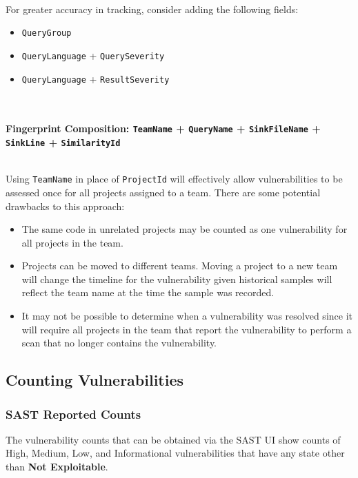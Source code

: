 \noindent\\For greater accuracy in tracking, consider adding the following fields:

\begin{itemize}
    \item \texttt{QueryGroup}
    \item \texttt{QueryLanguage} + \texttt{QuerySeverity}
    \item \texttt{QueryLanguage} + \texttt{ResultSeverity}
\end{itemize}

\textbf{\noindent\\\\Fingerprint Composition: \texttt{TeamName} + \texttt{QueryName} + \texttt{SinkFileName} + \texttt{SinkLine} + \texttt{SimilarityId}}

\noindent\\Using \texttt{TeamName} in place of \texttt{ProjectId} will effectively allow vulnerabilities to be assessed once for all projects assigned to a team.  There 
are some potential drawbacks to this approach:

\begin{itemize}
    \item The same code in unrelated projects may be counted as one vulnerability for all projects in the team.
    \item Projects can be moved to different teams.  Moving a project to a new team will change the timeline for the vulnerability given
    historical samples will reflect the team name at the time the sample was recorded.
    \item It may not be possible to determine when a vulnerability was resolved since it will require all projects in the team that report the
    vulnerability to perform a scan that no longer contains the vulnerability.  
\end{itemize}




\subsection{Counting Vulnerabilities}\label{sec:counting}

\subsubsection{SAST Reported Counts}

The vulnerability counts that can be obtained via the SAST UI show counts of High, Medium, Low, and Informational vulnerabilities that have any state other
than \textbf{Not Exploitable}.  

